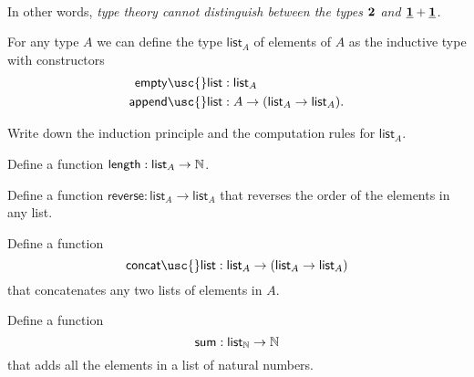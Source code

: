 \begin{exercises}
\begin{align*}
  \end{align*}
  In other words, \emph{type theory cannot distinguish between the types $\mathbf{2}$ and $\underline{\mathbf{1}}+\underline{\mathbf{1}}$.}
\item For any type $A$ we can define the type $\mathsf{list}_A$ of  elements of $A$ as the inductive type with constructors
  \begin{align*}
    \mathsf{empty\usc{}list} & : \mathsf{list}_A \\
    \mathsf{append\usc{}list} & : A \to (\mathsf{list}_A \to \mathsf{list}_A).
  \end{align*}
  \begin{subexenum}
  \item Write down the induction principle and the computation rules for $\mathsf{list}_A$.
  \item Define a function $\mathsf{length}:\mathsf{list}_A\to{\mathbb{N}}$.
  \item Define a function $\mathsf{reverse} : \mathsf{list}_A \to \mathsf{list}_A$ that reverses the order of the elements in any list.
  \item Define a function
    \begin{equation*}
      \mathsf{concat\usc{}list} : \mathsf{list}_A \to (\mathsf{list}_A \to \mathsf{list}_A)
    \end{equation*}
    that concatenates any two lists of elements in $A$.
  \item Define a function
    \begin{equation*}
      \mathsf{sum} : \mathsf{list}_{\mathbb{N}} \to {\mathbb{N}}
    \end{equation*}
    that adds all the elements in a list of natural numbers.
  \end{subexenum}
\end{exercises}

